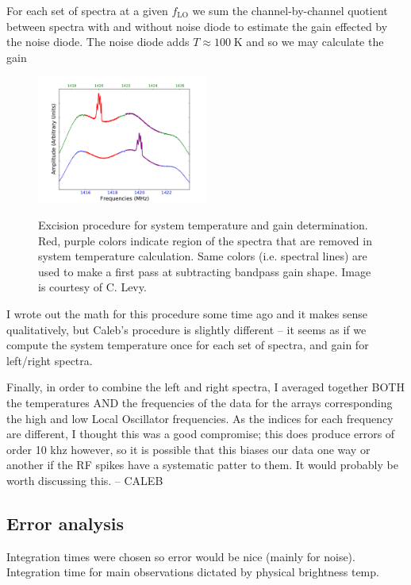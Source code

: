 \documentclass[10pt]{article}
\newcommand {\mt}{\mathrm}
\newcommand {\unit}[1]{\; \mt{#1}}
\begin{document}
For each set of spectra at a given $f_{\mt{LO}}$ we sum the channel-by-channel quotient between spectra with and without noise diode to estimate the gain effected by the noise diode.  The noise diode adds $T \approx 100\unit{K}$ and so we may calculate the gain 

\begin{figure}[!ht]
    \centering
    \includegraphics[width=0.5\textwidth]{Excized_Regions.pdf} \\
    \caption{Excision procedure for system temperature and gain determination.  Red, purple colors indicate region of the spectra that are removed in system temperature calculation.  Same colors (i.e. spectral lines) are used to make a first pass at subtracting bandpass gain shape.  Image is courtesy of C. Levy.}
    \label{fig:excized}
\end{figure}

I wrote out the math for this procedure some time ago and it makes sense qualitatively, but Caleb's procedure is slightly different -- it seems as if we compute the system temperature once for each set of spectra, and gain for left/right spectra.



Finally, in order to combine the left and right spectra, I averaged together BOTH the temperatures AND the frequencies of the data for the arrays corresponding the high and low Local Oscillator frequencies. As the indices for each frequency are different, I thought this was a good compromise; this does produce errors of order 10 khz however, so it is possible that this biases our data one way or another if the RF spikes have a systematic patter to them. It would probably be worth discussing this.
-- CALEB

\subsection{Error analysis}

Integration times were chosen so error would be nice (mainly for noise).  Integration time for main observations dictated by physical brightness temp.
\end{document}
